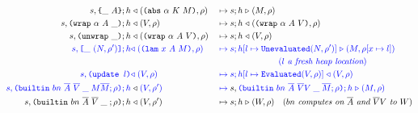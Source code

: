 \begin{figure*}[!ht]
\begin{subfigure}[c]{\linewidth}
{\begin{alignat*}{2}
      s,\texttt{\{}\_ ~ A\texttt{\}};h &\mathrel\triangleleft (\texttt{(} \texttt{abs} ~ \alpha ~ K ~ M \texttt{)},\rho) 
                                                    &{}\mapsto{}& s;h \mathrel\triangleright (M,\rho) \\
      s,\texttt{(} \texttt{wrap} ~ \alpha ~ A ~ \_ \texttt{)};h &\mathrel\triangleleft (V, \rho) &{}\mapsto{}& s;h \mathrel\triangleleft (\texttt{(} \texttt{wrap} ~ \alpha ~ A ~ V \texttt{)}, \rho)\\
      s,\texttt{(} \texttt{unwrap} ~ \_ \texttt{)}{};h &\mathrel\triangleleft (\texttt{(} \texttt{wrap} ~ \alpha ~ A ~ V \texttt{)}, \rho) 
                                                    &{}\mapsto{}& s;h \mathrel\triangleleft (V,\rho)\\
      \textcolor{blue}{s,\texttt{[} \_ ~ (N,\rho^{\prime}) \texttt{]};h} & \textcolor{blue}{\mathrel\triangleleft (\texttt{(} \texttt{lam} ~ x ~ A ~ M \texttt{)}, \rho)} 
                                                    &{}\color{blue}\mapsto{}& \textcolor{blue}{s;h[l\mapsto \texttt{Unevaluated}(N,\rho^{\prime})] \mathrel\triangleright (M, \rho[x \mapsto l])}\\
      & & & \hspace{2cm}\textcolor{blue}{(\textit{$l$ a fresh heap location})}\\
      \textcolor{blue}{s, \texttt{(update\ $l$)}} & \textcolor{blue}{\mathrel\triangleleft (V, \rho)}   &{}\color{blue}\mapsto{}& \textcolor{blue}{s;h[l\mapsto \texttt{Evaluated}(V, \rho)] \mathrel\triangleleft (V,\rho)}\\
      \textcolor{blue}{s, \texttt{(} \texttt{builtin} ~ bn ~ \overline{A} ~ \overline{V}\; \_\; M \overline{M}; \rho \texttt{)}{}; h} &\mathrel\triangleleft \textcolor{blue}{(V , \rho^{\prime})}
                                                    &{}\color{blue}\mapsto{}& s, \textcolor{blue}{\texttt{(} \texttt{builtin} ~ bn ~ \overline{A} ~ \overline{V} V\; \_\; \overline{M}; \rho \texttt{)};h \mathrel\triangleright (M, \rho)}\\
      s,\texttt{(} \texttt{builtin} ~ bn ~ \overline{A} ~ \overline{V}\; \_\; ; \rho \texttt{)}; h &\mathrel\triangleleft (V, \rho^{\prime}) 
                                                    &{}\mapsto{}& s;h \mathrel\triangleright (W, \rho) \quad 
                                                    (\textit{$bn$ computes on $\overline{A}$ and $\overline{V}V$ to $W$})\\
\end{alignat*}
}
\end{subfigure}

\end{figure*}


